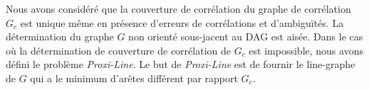 
Nous avons consid\'er\'e que
la couverture de corr\'elation du graphe de corr\'elation $G_c$ est unique m\^eme en pr\'esence d'erreurs de corr\'elations et d'ambigu\"{i}t\'es.  La d\'etermination du graphe $G$ non orient\'e sous-jacent au DAG est ais\'ee.
\newline
Dans le cas o\`u la d\'etermination de couverture de corr\'elation de $G_c$ est impossible, nous avons d\'efini le probl\`eme {\em Proxi-Line}. Le but de {\em Proxi-Line} est de fournir le line-graphe de $G$ qui a le minimum d'ar\^etes diff\'erent par rapport $G_c$.  